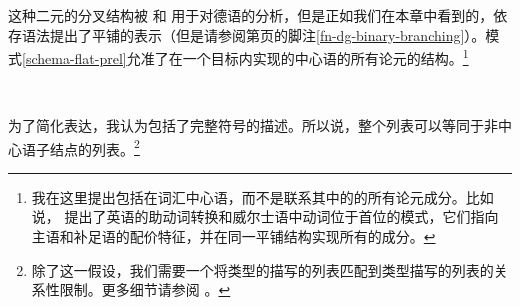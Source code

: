 这种二元的分叉结构被 \citet{Kathol95a,Kathol2000a}和 \citet{Mueller95c,Babel,Mueller99a,Mueller2002b}用于对德语的分析，但是正如我们在本章中看到的，依存语法提出了平铺的表示（但是请参阅第\pageref{fn-dg-binary-branching}页的脚注\ref{fn-dg-binary-branching}）。模式\ref{schema-flat-prel}允准了在一个目标内实现的中心语的所有论元的结构。\footnote{我在这里提出包括在词汇中心语，而不是联系其中的\subcatlc 的所有论元成分。比如说， \citet[]{Borsley89}提出了英语的助动词转换和威尔士语中动词位于首位的模式，它们指向主语和补足语的配价特征，并在同一平铺结构实现所有的成分。}
\begin{schema}
\label{schema-flat-prel}
 \impl\\
\end{schema}
为了简化表达，我认为\subcatlc 包括了完整符号的描述。所以说，整个列表可以等同于非中心语子结点的列表。\footnote{%
除了这一假设，我们需要一个将类型的描写的列表匹配到类型描写的列表的关系性限制。更多细节请参阅 。
}
